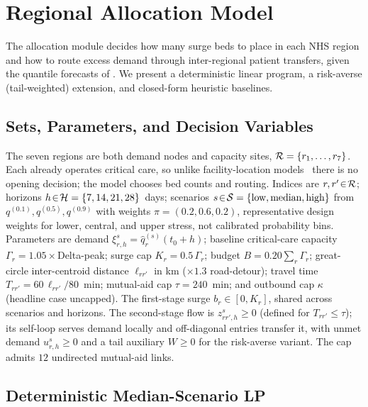 \section{Regional Allocation Model}\label{sec:optimisation}

The allocation module decides how many surge beds to place in each NHS
region and how to route excess demand through inter-regional patient
transfers, given the quantile forecasts of . We
present a deterministic linear program, a risk-averse (tail-weighted) extension,
and closed-form heuristic baselines.

\subsection{Sets, Parameters, and Decision Variables}\label{ssec:notation}

The seven regions are both demand nodes and capacity sites,
$\mathcal{R}=\{r_1,\ldots,r_7\}$. Each already operates critical care,
so unlike facility-location models~\cite{bertsimas2022where} there is no
opening decision; the model chooses bed counts and routing. Indices are
$r,r'\!\in\!\mathcal{R}$; horizons
$h\!\in\!\mathcal{H}=\{7,14,21,28\}$~days; scenarios
$s\!\in\!\mathcal{S}=\{\text{low},\text{median},\text{high}\}$ from
$q^{(0.1)},q^{(0.5)},q^{(0.9)}$ with weights
$\pi=(0.2,0.6,0.2)$, representative design weights for lower, central,
and upper stress, not calibrated probability bins. Parameters are demand
$\xi_{r,h}^s=\hat q_r^{(s)}(t_0+h)$; baseline critical-care capacity
$\Gamma_r=1.05\times$Delta-peak; surge cap $K_r=0.5\,\Gamma_r$; budget
$B=0.20\sum_r \Gamma_r$; great-circle inter-centroid distance $\ell_{r r'}$ in
km ($\times 1.3$ road-detour); travel time
$T_{r r'}=60\,\ell_{r r'}/80$~min; mutual-aid cap $\tau=240$~min; and
outbound cap $\kappa$ (headline case uncapped). The first-stage surge
$b_{r}\!\in\![0,K_r]$, shared across scenarios and horizons. The
second-stage flow is
$z_{r r',h}^s\!\geq\!0$ (defined for $T_{r r'}\!\leq\!\tau$); its
self-loop serves demand locally and off-diagonal entries transfer it, with
unmet demand $u_{r,h}^s\!\geq\!0$ and a tail auxiliary $W\!\geq\!0$ for
the risk-averse variant. The cap admits $12$ undirected mutual-aid links.

\subsection{Deterministic Median-Scenario LP}\label{ssec:milp}

